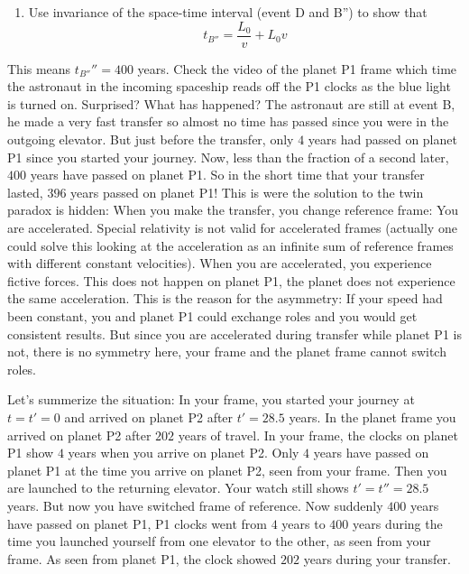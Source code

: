 {\begin{multicols}{2}
\begin{enumerate}
\item Use invariance of the space-time interval (event D and B'') to show that 
\[
t_{B''}=\frac{L_0}{v}+L_0v
\]
\end{enumerate}
This means $t_{B''}''=400$ years. Check the video of the planet P1 frame which time the astronaut in the incoming spaceship reads off the P1 clocks as the blue light is turned on. Surprised? What has happened? The astronaut are still at event B, he made a very fast transfer so almost no time has passed since you were in the outgoing elevator. But just before the transfer, only $4$ years had passed on planet P1 since you started your journey. Now, less than the fraction of a second later, $400$ years have passed on planet P1. So in the short time that your transfer lasted, $396$ years passed on planet P1! This is were the solution to the twin paradox is hidden: When you make the transfer, you change reference frame: You are accelerated. Special relativity is not valid for accelerated frames (actually one could solve this looking at the acceleration as an infinite sum of reference frames with different constant velocities). When you are accelerated, you experience fictive forces. This does not happen on planet P1, the planet does not experience the same acceleration. This is the reason for the asymmetry: If your speed had been constant, you and planet P1 could exchange roles and you would get consistent results. But since you are accelerated during transfer while planet P1 is not, there is no symmetry here, your frame  and the planet frame cannot switch roles.

Let's summerize the situation: In your frame, you started your journey at $t=t'=0$ and arrived on planet P2 after $t'=28.5$ years. In the planet frame you arrived on planet P2 after $202$ years of travel. In your frame, the clocks on planet P1 show $4$ years when you arrive on planet P2. Only $4$ years have passed on planet P1 at the time you arrive on planet P2, seen from your frame. Then you are launched to the returning elevator. Your watch still shows $t'=t''=28.5$ years. But now you have switched frame of reference. Now suddenly $400$ years have passed on planet P1, P1 clocks went from $4$ years to $400$ years during the time you launched yourself from one elevator to the other, as seen from your frame. As seen from planet P1, the clock showed $202$ years during your transfer.


\end{multicols}}
